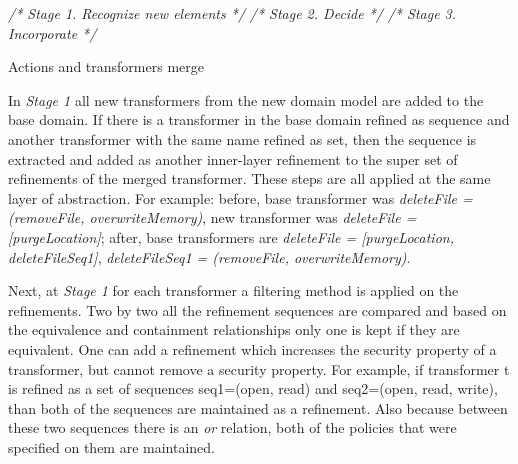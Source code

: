 \documentclass{sig-alternate}
\begin{document}
\IncMargin{1em}
\begin{algorithm}
  \BlankLine
  	\emph{/* Stage 1. Recognize new elements */}\;
  	\emph{/* Stage 2. Decide */}\;
	\emph{/* Stage 3. Incorporate */}\;  
  \caption{Actions and transformers merge}\label{algo_at}
\end{algorithm}
\DecMargin{1em}

In \textit{Stage 1} all new transformers from the new domain model are added to the base domain.
If there is a transformer in the base domain refined as sequence and another transformer with the same name refined as set,
then the sequence is extracted and added as another inner-layer refinement to the super set of refinements of the merged transformer.
These steps are all applied at the same layer of abstraction.
For example: before, base transformer was \textit{deleteFile = (removeFile, overwriteMemory)}, 
new transformer was \textit{deleteFile = [purgeLocation]};
after, base transformers are \textit{deleteFile = [purgeLocation, deleteFileSeq1]}, \textit{deleteFileSeq1 = (removeFile, overwriteMemory)}.


Next, at \textit{Stage 1} for each transformer a filtering method is applied on the refinements.
Two by two all the refinement sequences are compared and based on the equivalence and containment relationships only one is kept if they are equivalent.
One can add a refinement which increases the security property of a transformer, but cannot remove a security property.
For example, if transformer t is refined as a set of sequences seq1=(open, read) and seq2=(open, read, write), 
than both of the sequences are maintained as a refinement. 
Also because between these two sequences there is an \textit{or} relation, both of the policies that were specified on them are maintained.
\end{document}
